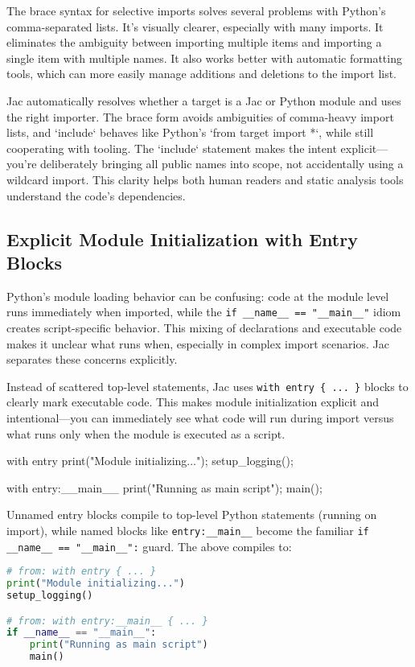 The brace syntax for selective imports solves several problems with Python's comma-separated lists. It's visually clearer, especially with many imports. It eliminates the ambiguity between importing multiple items and importing a single item with multiple names. It also works better with automatic formatting tools, which can more easily manage additions and deletions to the import list.

Jac automatically resolves whether a target is a Jac or Python module and uses the right importer. The brace form avoids ambiguities of comma-heavy import lists, and `include` behaves like Python's `from target import *`, while still cooperating with tooling. The `include` statement makes the intent explicit—you're deliberately bringing all public names into scope, not accidentally using a wildcard import. This clarity helps both human readers and static analysis tools understand the code's dependencies.

\subsection{Explicit Module Initialization with Entry Blocks}

Python's module loading behavior can be confusing: code at the module level runs immediately when imported, while the \verb|if __name__ == "__main__"| idiom creates script-specific behavior. This mixing of declarations and executable code makes it unclear what runs when, especially in complex import scenarios. Jac separates these concerns explicitly.

Instead of scattered top-level statements, Jac uses \verb|with entry { ... }| blocks to clearly mark executable code. This makes module initialization explicit and intentional—you can immediately see what code will run during import versus what runs only when the module is executed as a script.

\begin{jacblock}
with entry {
    print("Module initializing...");
    setup_logging();
}

with entry:__main__ {
    print("Running as main script");
    main();
}
\end{jacblock}

Unnamed entry blocks compile to top-level Python statements (running on import), while named blocks like \verb|entry:__main__| become the familiar \verb|if __name__ == "__main__":| guard. The above compiles to:

\begin{lstlisting}[language=Python]
# from: with entry { ... }
print("Module initializing...")
setup_logging()

# from: with entry:__main__ { ... }
if __name__ == "__main__":
    print("Running as main script")
    main()
\end{lstlisting}

